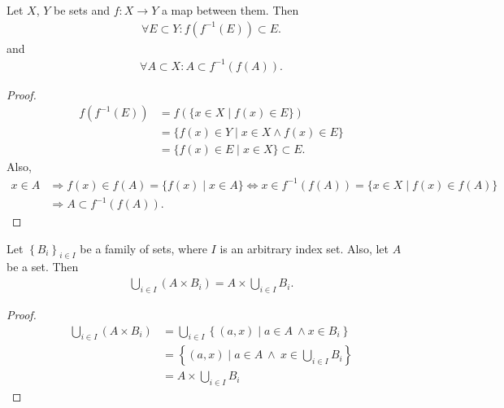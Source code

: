 \begin{theorem}
	Let $X$, $Y$ be sets and $f: X\to Y$ a map between them. Then 
	\begin{align}\label{eq:image_preimage_of_set}
		\forall E\subset Y: f(f^{-1}(E))\subset E.
	\end{align}
	and 
	\begin{align}\label{eq:preimage_image_of_set}
		\forall A\subset X: A\subset f^{-1}(f(A)).
	\end{align}
\end{theorem}

\begin{proof}
	\begin{align*}
		f(f^{-1}(E)) &= f(\{x\in X\mid f(x)\in E\}) \\ &= \{f(x)\in Y\mid x\in X\wedge f(x)\in E\} \\ &= \{ f(x)\in E\mid x\in X \}\subset E.
	\end{align*}
	Also, 
	\begin{align*}
		x\in A&\Rightarrow f(x)\in f(A) = \{f(x)\mid x\in A\}\Leftrightarrow x\in f^{-1}(f(A)) = \{x\in X\mid f(x)\in f(A)\}
		\\ &\Rightarrow A\subset f^{-1}(f(A)).
	\end{align*}
\end{proof}

\begin{theorem}\label{thrm:cartesian_product_union}
	Let $\left\{B_i\right\}_{i\in I}$ be a family of sets, where $I$ is an arbitrary index set. Also, let $A$ be a set. Then 
	\begin{align}\label{eq:cartesian_product_union}
		\bigcup_{i\in I}(A\times B_i) = A\times \bigcup_{i\in I}B_i.
	\end{align}
\end{theorem}

\begin{proof}
	\begin{align*}
		\bigcup_{i\in I}(A\times B_i) &= \bigcup_{i\in I}\left\{(a, x) \mid a\in A \ \wedge x\in B_i \right\} \\ &= \left\{ (a, x)\mid a\in A\ \wedge\ x\in \bigcup_{i\in I}B_i \right\} \\ &= A\times \bigcup_{i\in I}B_i
	\end{align*}
\end{proof}